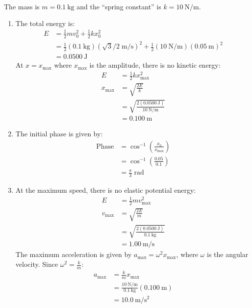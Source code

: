 \begin{solution}
    \begin{subsolution}
        The mass is $m=\qty{0.1}{\kg}$ and the ``spring constant'' is $k=\qty{10}{\N\per\m}$.
        \renewcommand{\theenumi}{(\alph{enumi})}
        \begin{enumerate}
            \item The total energy is:
            \begin{align*}
                E&=\frac{1}{2}mv_0^2+\frac{1}{2}kx_0^2\\
                &=\frac{1}{2}(\qty{0.1}{\kg})(\sqrt{3}/2\;\unit{\m\per\s})^2+\frac{1}{2}(\qty{10}{\N\per\m})(\qty{0.05}{\m})^2\\
                &=\qty{0.0500}{\J}
            \end{align*}
            At \(x=x_{\mathrm{max}}\) where $x_{\mathrm{max}}$ is the amplitude, there is no kinetic energy:
            \begin{align*}
                E&=\frac{1}{2}kx_{\mathrm{max}}^2\\
                x_{\mathrm{max}}&=\sqrt{\frac{2E}{k}}\\
                &=\sqrt{\frac{2(\qty{0.0500}{\J})}{\qty{10}{\N\per\m}}}\\
                &=\boxed{\qty{0.100}{\m}}
            \end{align*}
            \item The initial phase is given by:
            \begin{align*}
                \text{Phase}&=\cos^{-1}\left(\frac{x_0}{x_{\mathrm{max}}}\right)\\
                &=\cos^{-1}\left(\frac{0.05}{0.1}\right)\\
                &=\boxed{\frac{\pi}{3}\;\unit{\radian}}
            \end{align*}
            \item At the maximum speed, there is no elastic potential energy:
            \begin{align*}
                E&=\frac{1}{2}mv_{\mathrm{max}}^2\\
                v_{\mathrm{max}}&=\sqrt{\frac{2E}{m}}\\
                &=\sqrt{\frac{2(\qty{0.0500}{\J})}{\qty{0.1}{\kg}}}\\
                &=\boxed{\qty{1.00}{\m\per\s}}
            \end{align*}
            The maximum acceleration is given by \(a_{\mathrm{max}}=\omega^2x_{\mathrm{max}}\), where $\omega$ is the angular velocity. Since \(\omega^2=\frac{k}{m}\):
            \begin{align*}
                a_{\mathrm{max}}&=\frac{k}{m}x_{\mathrm{max}}\\
                &=\frac{\qty{10}{\N\per\m}}{\qty{0.1}{\kg}}(\qty{0.100}{\m})\\
                &=\boxed{\qty{10.0}{\m\per\square\s}}
            \end{align*}
        \end{enumerate}
    \end{subsolution}
    

\end{solution}
